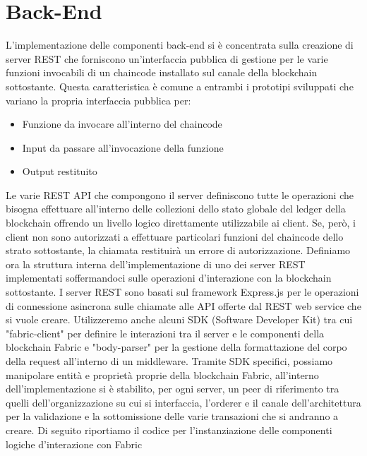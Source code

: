 \section{Back-End}
L'implementazione delle componenti back-end si è concentrata sulla creazione di server REST che forniscono un'interfaccia pubblica di gestione per le varie funzioni invocabili di un chaincode installato sul canale della blockchain sottostante. Questa caratteristica è comune a entrambi i prototipi sviluppati che variano la propria interfaccia pubblica per: 
\begin{itemize}
    \item Funzione da invocare all'interno del chaincode
    \item Input da passare all'invocazione della funzione
    \item Output restituito
\end{itemize}
Le varie REST API che compongono il server definiscono tutte le operazioni che bisogna effettuare all'interno delle collezioni dello stato globale del ledger della blockchain offrendo un livello logico direttamente utilizzabile ai client. Se, però, i client non sono autorizzati a effettuare particolari funzioni del chaincode dello strato sottostante, la chiamata restituirà un errore di autorizzazione. Definiamo ora la struttura interna dell'implementazione di uno dei server REST implementati soffermandoci sulle operazioni d'interazione con la blockchain sottostante. 
I server REST sono basati sul framework Express.js per le operazioni di connessione asincrona sulle chiamate alle API offerte dal REST web service che si vuole creare. Utilizzeremo anche alcuni SDK (Software Developer Kit) tra cui "fabric-client" per definire le interazioni tra il server e le componenti della blockchain Fabric e "body-parser" per la gestione della formattazione del corpo della request all'interno di un middleware. Tramite SDK specifici, possiamo manipolare entità e proprietà proprie della blockchain Fabric, all'interno dell'implementazione si è stabilito, per ogni server, un peer di riferimento tra quelli dell'organizzazione su cui si interfaccia, l'orderer e il canale dell'architettura per la validazione e la sottomissione delle varie transazioni che si andranno a creare. 
Di seguito riportiamo il codice per l'instanziazione delle componenti logiche d'interazione con Fabric
